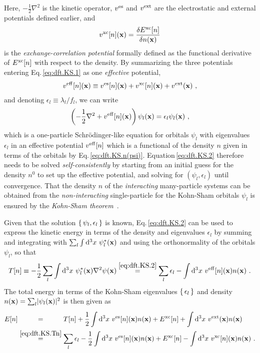 Here, $-\frac{1}{2} \nabla^2$ is the kinetic operator, $v^{\rm es}$ and $v^{\rm ext}$ are the electrostatic and external potentials defined earlier, and
\begin{align}
	v^{\rm xc} [n] ({\bf x})
		= \frac{\delta E^{\rm xc}[n]}{\delta n ({\bf x})}
	\label{eq:dft.vxc}
\end{align}
is the \emph{exchange-correlation potential} formally defined as the functional derivative of $E^{\rm xc} [n]$ with respect to the density. By summarizing the three potentials entering Eq.\,\eqref{eq:dft.KS.1} as one \emph{effective} potential,
\begin{align}
	v^{\rm eff} [n] ({\bf x})
	\equiv
		v^{\rm es} [n] ({\bf x})
		+ v^{\rm xc} [n] ({\bf x})
		+ v^{\rm ext}  ({\bf x})~,
	\label{eq:dft.KS.veff}
\end{align}
 and denoting $\epsilon_l \equiv \lambda_l / f_l$, we can write
\begin{align}
	\left(
		-\frac{1}{2} \nabla^2 
		+ v^{\rm eff} [n] ({\bf x})
	\right) \psi_l ({\bf x})
	= \epsilon_l \psi_l ({\bf x})~,
\label{eq:dft.KS.2}
\end{align}
which is a one-particle Schr\"odinger-like equation for orbitals $\psi_l$ with eigenvalues $\epsilon_l$ in an effective potential $v^{\rm eff}[n]$ which is a functional of the density $n$ given in terms of the orbitals by Eq.\,\eqref{eq:dft.KS.n(psi)}. Equation\,\eqref{eq:dft.KS.2} therefore needs to be solved \emph{self-consistently} by starting from an initial guess for the density $n^0$ to set up the effective potential, and solving for $(\psi_l, \epsilon_l)$ until convergence. That the density $n$ of the \emph{interacting} many-particle systems can be obtained from the \emph{non-interacting} single-particle for the Kohn-Sham orbitals $\psi_l$ is ensured by the \emph{Kohn-Sham theorem}~.

Given that the solution $\set{\psi_l, \epsilon_l}$ is known, Eq.\,\eqref{eq:dft.KS.2} can be used to express the kinetic energy in terms of the density and eigenvalues $\epsilon_l$ by summing and integrating with $\sum_l \int {\rm d}^3 x~\psi^\ast_l ({\bf x})$ and using the orthonormality of the orbitals $\psi_l$, so that
\begin{align}
	T[n] 
		\equiv - \frac{1}{2}\sum_l \int {\rm d}^3 x ~ \psi^\ast_l ({\bf x}) \nabla^2 \psi({\bf x})
		\stackrel{\eqref{eq:dft.KS.2}}{=} 
			\sum_l \epsilon_l 
			- \int {\rm d}^3 x ~ v^{\rm eff}[n] ({\bf x}) n({\bf x})~.
	\label{eq:dft.KS.Tn}
\end{align}
The total energy in terms of the Kohn-Sham eigenvalues $\set{\epsilon_l}$ and density $n ({\bf x}) = \sum_l \lvert \psi_l ({\bf x}) \rvert^2$ is then given as
\begin{align}
	E[n]
		&\stackrel{\phantom{\eqref{eq:dft.KS.Tn}}}{=} 
			T[n] 
			+ \frac{1}{2} \int \d^3 x ~ v^{\rm es} [n] ({\bf x}) n ({\bf x})
			+ E^{\rm xc}[n]
			+ \int \d^3 x ~ v^{\rm ext} ({\bf x}) n ({\bf x})
			\nonumber \\
		&\stackrel{\eqref{eq:dft.KS.Tn}}{=}
			\sum_l \epsilon_l 
			- \frac{1}{2} \int \d^3 x ~ v^{\rm es} [n] ({\bf x}) n ({\bf x})
			+ E^{\rm xc}[n]
			- \int \d^3 x ~ v^{\rm xc}[n] ({\bf x}) n ({\bf x})~.
	\label{eq:dft.KS.En}
\end{align}

